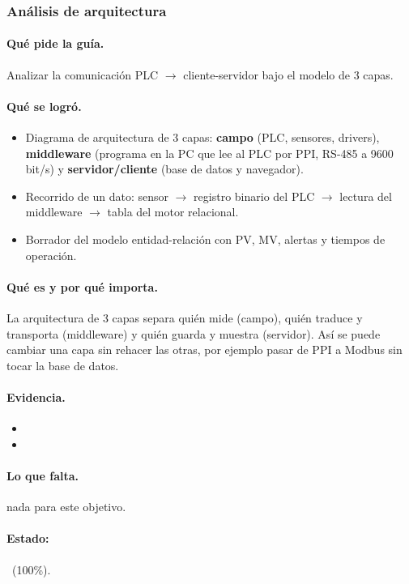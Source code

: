 \documentclass[a4paper,11pt]{article}
\begin{document}
\subsubsection{Análisis de arquitectura}
\paragraph{Qué pide la guía.} Analizar la comunicación PLC $\to$ cliente-servidor bajo el modelo de 3 capas.
\paragraph{Qué se logró.}
\begin{itemize}
\item Diagrama de arquitectura de 3 capas: \textbf{campo} (PLC, sensores, drivers), \textbf{middleware} (programa en la PC que lee al PLC por PPI, RS-485 a 9600 bit/s) y \textbf{servidor/cliente} (base de datos y navegador).
\item Recorrido de un dato: sensor $\to$ registro binario del PLC $\to$ lectura del middleware $\to$ tabla del motor relacional.
\item Borrador del modelo entidad-relación con PV, MV, alertas y tiempos de operación.
\end{itemize}
\paragraph{Qué es y por qué importa.} La arquitectura de 3 capas separa quién mide (campo), quién traduce y transporta (middleware) y quién guarda y muestra (servidor). Así se puede cambiar una capa sin rehacer las otras, por ejemplo pasar de PPI a Modbus sin tocar la base de datos.
\paragraph{Evidencia.}
\begin{itemize}\small
\item {}
\item {}
\end{itemize}
\paragraph{Lo que falta.} nada para este objetivo.
\paragraph{Estado:} \cumple~(100\%).
\end{document}

